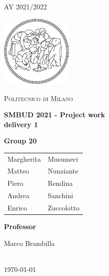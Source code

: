 \documentclass[table, 12pt]{article}
\begin{document}
\begin{titlepage}
    \centering
    {\scshape\large AY 2021/2022 \par}
    \vfill
    \includegraphics[width=100pt]{images/logo-polimi-new.pdf}\par\vspace{1cm}
    {\scshape\LARGE Politecnico di Milano \par}
    \vspace{1.5cm}
    {\huge\bfseries SMBUD 2021 - Project work\@ \\ delivery 1  \par}
    
    \vspace{1.5cm}
    {\large \textbf{Group 20} \par
    
    \begin{center}
        
         
        {\begin{tabular}{l l }
        Margherita & Musumeci \\
        Matteo & Nunziante \\
        Piero & Rendina \\
        Andrea & Sanchini \\
        Enrico & Zuccolotto \\
        \end{tabular}}
        
    \end{center}
    }
    \vfill
    \begin{center}
        {\large \textbf{Professor}\par
            Marco Brambilla}
          \vspace{1cm}
        {\large \\ \today \par}
    \end{center}
\end{titlepage}
\thispagestyle{plain}
\mbox{}

\tableofcontents


\newpage



\newpage


\end{document}
